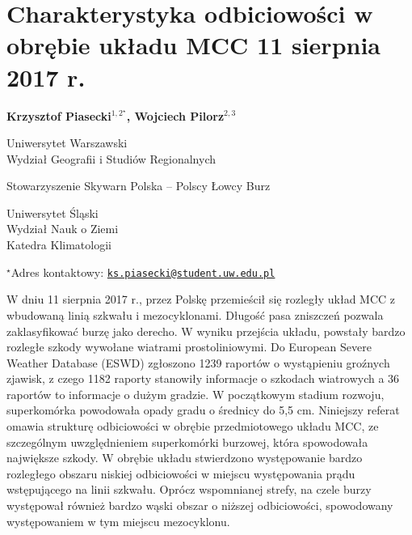 \documentclass[\main/boa.tex]{subfiles}
\begin{document}
\section{Charakterystyka odbiciowości w obrębie układu MCC 11 sierpnia 2017 r.}

\begin{center}
  {\bf {} Krzysztof Piasecki$^{1,2^\star}$,  Wojciech Pilorz$^{2,3}$}
\end{center}

\vskip 0.3cm

\begin{affiliations}
\begin{enumerate}
\begin{minipage}{0.915\textwidth}
\centering
\item Uniwersytet Warszawski \\ Wydział Geografii i Studiów Regionalnych
\item Stowarzyszenie Skywarn Polska – Polscy Łowcy Burz\\[-2pt]
\item Uniwersytet Śląski\\Wydział Nauk o Ziemi\\ Katedra Klimatologii\\[-2pt]
\end{minipage}
\end{enumerate}
$^\star$Adres kontaktowy: \href{mailto:ks.piasecki@student.uw.edu.pl}{\nolinkurl{ks.piasecki@student.uw.edu.pl}}\\
\end{affiliations}

\vskip 0.5cm


\vskip 0.5cm

W dniu 11 sierpnia 2017 r., przez Polskę przemieścił się rozległy układ MCC z wbudowaną linią szkwału i mezocyklonami. Długość pasa zniszczeń pozwala zaklasyfikować burzę jako derecho. W wyniku przejścia układu, powstały bardzo rozległe szkody wywołane wiatrami prostoliniowymi. Do European Severe Weather Database (ESWD) zgłoszono 1239 raportów o wystąpieniu groźnych zjawisk, z czego 1182 raporty stanowiły informacje o szkodach wiatrowych a 36 raportów to informacje o dużym gradzie. W początkowym stadium rozwoju, superkomórka powodowała opady gradu o średnicy do 5,5 cm. Niniejszy referat omawia strukturę odbiciowości w obrębie przedmiotowego układu MCC, ze szczególnym uwzględnieniem superkomórki burzowej, która spowodowała największe szkody. W obrębie układu stwierdzono występowanie bardzo rozległego obszaru niskiej odbiciowości w miejscu występowania prądu wstępującego na linii szkwału. Oprócz wspomnianej strefy, na czele burzy występował również bardzo wąski obszar o niższej odbiciowości, spowodowany występowaniem w tym miejscu mezocyklonu.
\end{document}
